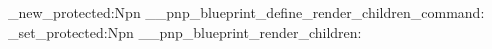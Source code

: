 %
%
%
\cs_new_protected:Npn \__pnp_blueprint_define_render_children_command:
  {
    \cs_set_protected:Npn \renderChildren
      {
        \__pnp_blueprint_render_children:
      }
  }

